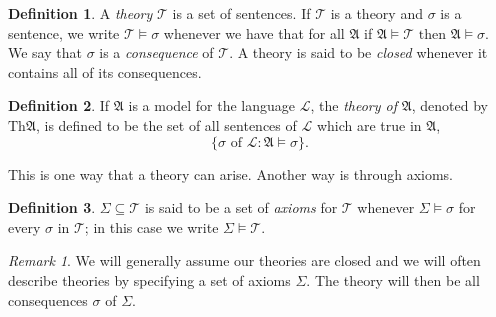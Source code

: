 \documentclass[titlepage, oneside]{amsbook}
\theoremstyle{plain}
\theoremstyle{definition}
\newtheorem{definition}{Definition}
\theoremstyle{remark}
\newtheorem*{rem}{Remark}
\newcommand{\Th}{\ensuremath{\mbox{Th}}}
\newcommand{\lan}{\ensuremath{\mathcal{L}}}
\newcommand{\ma}{\ensuremath{\mathfrak{A}}}
\begin{document}
\begin{definition}\label{D:theory}
%
A \emph{theory} $\mathcal{T}$ is a set of sentences. If $\mathcal{T} $
is a theory and $\sigma$ is a sentence, we write 
$\mathcal{T} \models \sigma$ whenever we have that for all $\mathfrak{A}$ 
if $\mathfrak{A} \models \mathcal{T} \mbox{ then } \mathfrak{A} \models 
\sigma$. We say that $\sigma$ is a \emph{consequence} of $\mathcal{T}$. A 
theory is said to be \emph{closed} whenever it contains all of its 
consequences.

\end{definition}

\begin{definition}
%
%
  If $\ma$ is a model for the language
$\lan$, the
\emph{theory of} $\ma$, denoted by $\Th \ma$, is defined to be the set
of all sentences of $\lan$ which are true in $\ma$, \[ \{ \sigma
\mbox{ of } \lan : \ma \models \sigma \}. \]

This is one way that a theory can arise.  Another way is through
axioms.

\end{definition}


\begin{definition}
%
 $\Sigma \subseteq \mathcal{T}$ is said to be a set of
\emph{axioms} for 
$\mathcal{T}$ 
whenever $\Sigma  \models \sigma$ for every $\sigma$ in $\mathcal{T}$;
in this case we write $ \Sigma \models \mathcal{T}$.

\end{definition}


\begin{rem} We will generally assume our theories are closed and we
will often describe theories by specifying a set of axioms $\Sigma$.
The theory will then be all consequences $\sigma$ of $\Sigma$.
\end{rem}
\end{document}
